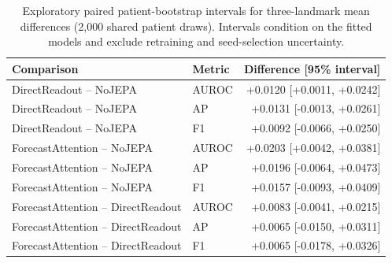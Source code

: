 \begin{table}[t]
\centering
\small
\caption{Exploratory paired patient-bootstrap intervals for three-landmark mean differences (2,000 shared patient draws). Intervals condition on the fitted models and exclude retraining and seed-selection uncertainty.}
\label{tab:bootstrap}
\begin{tabular}{llr}
\toprule
Comparison & Metric & Difference [95\% interval] \\
\midrule
DirectReadout -- NoJEPA & AUROC & +0.0120 [+0.0011, +0.0242] \\
DirectReadout -- NoJEPA & AP & +0.0131 [-0.0013, +0.0261] \\
DirectReadout -- NoJEPA & F1 & +0.0092 [-0.0066, +0.0250] \\
ForecastAttention -- NoJEPA & AUROC & +0.0203 [+0.0042, +0.0381] \\
ForecastAttention -- NoJEPA & AP & +0.0196 [-0.0064, +0.0473] \\
ForecastAttention -- NoJEPA & F1 & +0.0157 [-0.0093, +0.0409] \\
ForecastAttention -- DirectReadout & AUROC & +0.0083 [-0.0041, +0.0215] \\
ForecastAttention -- DirectReadout & AP & +0.0065 [-0.0150, +0.0311] \\
ForecastAttention -- DirectReadout & F1 & +0.0065 [-0.0178, +0.0326] \\
\bottomrule
\end{tabular}
\end{table}
